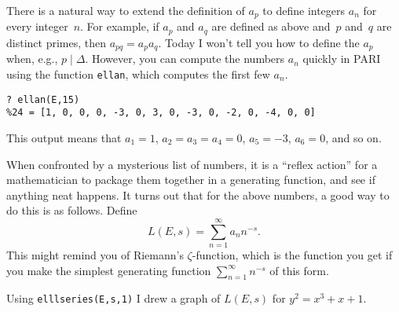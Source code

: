 \documentclass[11pt]{report}
\begin{document}
There is a natural way to extend the definition of
$a_p$ to define integers $a_n$ for every integer~$n$.
For example, if $a_p$ and $a_q$ are defined as above
and~$p$ and~$q$ are distinct primes, then
$a_{pq}=a_p a_q$.
Today I won't tell you how to define the $a_p$ when,
e.g., $p\mid \Delta$.
However, you can compute the numbers $a_n$ quickly
in PARI using the function {\tt ellan}, which computes
the first few $a_n$.
\begin{verbatim}
? ellan(E,15)
%24 = [1, 0, 0, 0, -3, 0, 3, 0, -3, 0, -2, 0, -4, 0, 0]
\end{verbatim}
This output means that
$a_1=1$, $a_2=a_3=a_4=0$, $a_5=-3$, $a_6=0$, and so on.

When confronted by a mysterious list of numbers,
it is a ``reflex action'' for a mathematician to
package them together in a generating function, and see
if anything neat happens.   It turns out that for the above
numbers, a good way to do this is as follows.  Define
$$
  L(E,s) = \sum_{n=1}^{\infty} a_n n^{-s}.
$$
This might remind you of Riemann's $\zeta$-function, which
is the function you get if you make the simplest generating
function $\sum_{n=1}^{\infty} n^{-s}$ of this form.

Using {\tt elllseries(E,s,1)} I drew a
graph of $L(E,s)$ for $y^2=x^3+x+1$.
\vspace{1.2ex}
\end{document}
